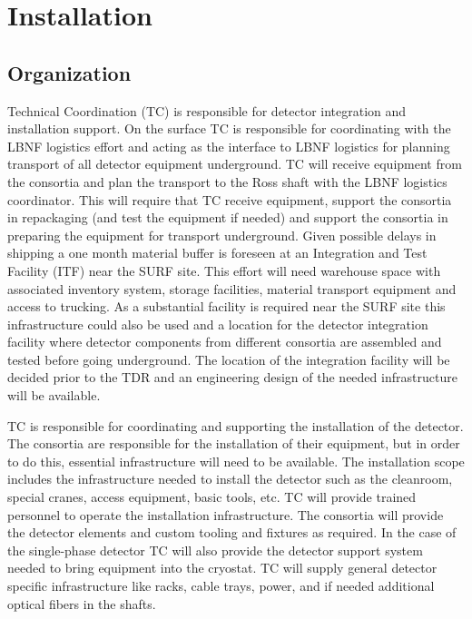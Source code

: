 \section{Installation}
\label{sec:fdsp-coord-install}

\subsection{Organization}
\label{sec:fdsp-coord-org}

Technical Coordination (TC) is responsible for detector integration
and installation support. On the surface TC is responsible for
coordinating with the LBNF logistics effort and acting as the
interface to LBNF logistics for planning transport of all detector
equipment underground. TC will receive equipment from the consortia
and plan the transport to the Ross shaft with the LBNF logistics
coordinator. This will require that TC receive equipment, support the
consortia in repackaging (and test the equipment if needed) and
support the consortia in preparing the equipment for transport
underground. Given possible delays in shipping a one month material
buffer is foreseen at an Integration and Test Facility (ITF) near the
SURF site. This effort will need warehouse space with associated
inventory system, storage facilities, material transport equipment and
access to trucking. As a substantial facility is required near the
SURF site this infrastructure could also be used and a location for
the detector integration facility where detector components from
different consortia are assembled and tested before going
underground. The location of the integration facility will be decided
prior to the TDR and an engineering design of the needed
infrastructure will be available.

TC is responsible for coordinating and supporting the installation of
the detector. The consortia are responsible for the installation of
their equipment, but in order to do this, essential infrastructure
will need to be available. The installation scope includes the
infrastructure needed to install the detector such as the cleanroom,
special cranes, access equipment, basic tools, etc. TC will provide
trained personnel to operate the installation infrastructure. The
consortia will provide the detector elements and custom tooling and
fixtures as required. In the case of the single-phase detector TC will
also provide the detector support system 
needed to bring equipment into the cryostat. TC will supply general
detector specific infrastructure like racks, cable trays, power, and
if needed additional optical fibers in the shafts.

